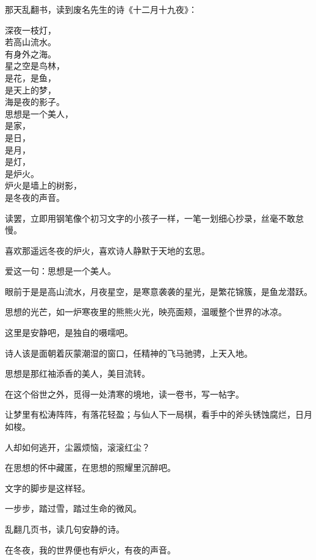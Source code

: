 	\endwriting



		那天乱翻书，读到废名先生的诗《十二月十九夜》：

		\longpoem{}{}{}
			深夜一枝灯，\\
			若高山流水。\\
			有身外之海。\\
			星之空是鸟林，\\
			是花，是鱼，\\
			是天上的梦，\\
			海是夜的影子。\\
			思想是一个美人，\\
			是家，\\
			是日，\\
			是月，\\
			是灯，\\
			是炉火。\\
			炉火是墙上的树影，\\
			是冬夜的声音。
		\endlongpoem

		读罢，立即用钢笔像个初习文字的小孩子一样，一笔一划细心抄录，丝毫不敢怠慢。\par
		喜欢那遥远冬夜的炉火，喜欢诗人静默于天地的玄思。\par
		爱这一句：思想是一个美人。

		眼前于是是高山流水，月夜星空，是寒意袭袭的星光，是繁花锦簇，是鱼龙潜跃。\par
		思想的光芒，如一炉寒夜里的熊熊火光，映亮面颊，温暖整个世界的冰凉。

		这里是安静吧，是独自的嗫嚅吧。\par
		诗人该是面朝着灰蒙潮湿的窗口，任精神的飞马驰骋，上天入地。

		思想是那红袖添香的美人，美目流转。

		在这个俗世之外，觅得一处清寒的境地，读一卷书，写一帖字。\par
		让梦里有松涛阵阵，有落花轻盈；与仙人下一局棋，看手中的斧头锈蚀腐烂，日月如梭。

		人却如何逃开，尘嚣烦恼，滚滚红尘？\par
		在思想的怀中藏匿，在思想的照耀里沉醉吧。

		文字的脚步是这样轻。\par
		一步步，踏过雪，踏过生命的微风。\par
		乱翻几页书，读几句安静的诗。\par
		在冬夜，我的世界便也有炉火，有夜的声音。

	\endwriting


